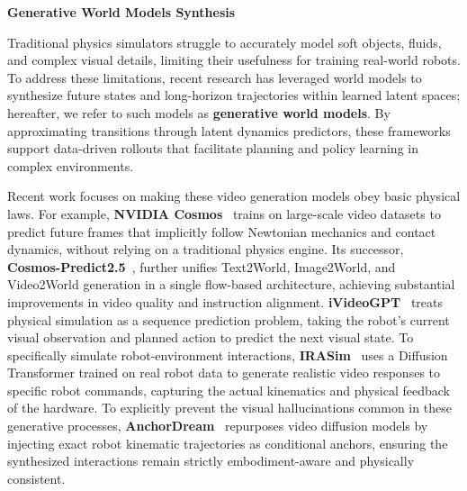 \documentclass[acmsmall,screen,review,anonymous]{acmart}
\begin{document}
\textbf{Generative World Models Synthesis}

Traditional physics simulators struggle to accurately model soft objects, fluids, and complex visual details, limiting their usefulness for training real-world robots. 
To address these limitations, recent research has leveraged world models to synthesize future states and long-horizon trajectories within learned latent spaces; hereafter, we refer to such models as \textbf{generative world models}.
By approximating transitions through latent dynamics predictors, these frameworks support data-driven rollouts that facilitate planning and policy learning in complex environments.

Recent work focuses on making these video generation models obey basic physical laws. For example, \textbf{NVIDIA Cosmos}~\cite{nvidia2025cosmos} trains on large-scale video datasets to predict future frames that implicitly follow Newtonian mechanics and contact dynamics, without relying on a traditional physics engine. Its successor, \textbf{Cosmos-Predict2.5}~\cite{nvidia2025cosmospredict25}, further unifies Text2World, Image2World, and Video2World generation in a single flow-based architecture, achieving substantial improvements in video quality and instruction alignment. 
\textbf{iVideoGPT}~\cite{wu2024ivideogpt} treats physical simulation as a sequence prediction problem, taking the robot's current visual observation and planned action to predict the next visual state. 
To specifically simulate robot-environment interactions, \textbf{IRASim}~\cite{zhu2025irasim} uses a Diffusion Transformer trained on real robot data to generate realistic video responses to specific robot commands, capturing the actual kinematics and physical feedback of the hardware. 
To explicitly prevent the visual hallucinations common in these generative processes, \textbf{AnchorDream}~\cite{ye2025anchordream} repurposes video diffusion models by injecting exact robot kinematic trajectories as conditional anchors, ensuring the synthesized interactions remain strictly embodiment-aware and physically consistent.
\end{document}
